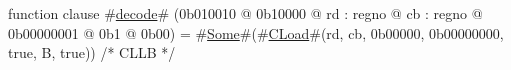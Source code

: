 function clause #\hyperref[zdecode]{decode}# (0b010010 @ 0b10000 @ rd : regno @ cb : regno @ 0b00000001 @ 0b1 @ 0b00) = #\hyperref[zSome]{Some}#(#\hyperref[zCLoad]{CLoad}#(rd, cb, 0b00000, 0b00000000, true,  B, true)) /* CLLB  */
